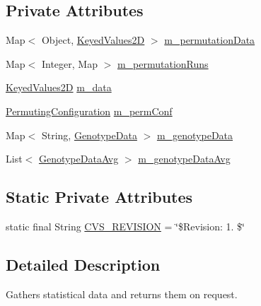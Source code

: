 \subsection*{Private Attributes}
\begin{DoxyCompactItemize}
\item 
Map$<$ Object, \hyperlink{classorg_1_1jgap_1_1audit_1_1_keyed_values2_d}{Keyed\-Values2\-D} $>$ \hyperlink{classorg_1_1jgap_1_1audit_1_1_evaluator_ab3402fedd8070cb0c0b8c693148b1c01}{m\-\_\-permutation\-Data}
\item 
Map$<$ Integer, Map $>$ \hyperlink{classorg_1_1jgap_1_1audit_1_1_evaluator_a841cc8c34e1870b35fe0e38715841e15}{m\-\_\-permutation\-Runs}
\item 
\hyperlink{classorg_1_1jgap_1_1audit_1_1_keyed_values2_d}{Keyed\-Values2\-D} \hyperlink{classorg_1_1jgap_1_1audit_1_1_evaluator_a7e7c140d026509d201e2054509293d88}{m\-\_\-data}
\item 
\hyperlink{classorg_1_1jgap_1_1audit_1_1_permuting_configuration}{Permuting\-Configuration} \hyperlink{classorg_1_1jgap_1_1audit_1_1_evaluator_aec14a492e20dcda8a92c18a8c76c10f3}{m\-\_\-perm\-Conf}
\item 
Map$<$ String, \hyperlink{classorg_1_1jgap_1_1audit_1_1_evaluator_1_1_genotype_data}{Genotype\-Data} $>$ \hyperlink{classorg_1_1jgap_1_1audit_1_1_evaluator_ae43c46df70ad2023f57b30b9cf039000}{m\-\_\-genotype\-Data}
\item 
List$<$ \hyperlink{classorg_1_1jgap_1_1audit_1_1_evaluator_1_1_genotype_data_avg}{Genotype\-Data\-Avg} $>$ \hyperlink{classorg_1_1jgap_1_1audit_1_1_evaluator_ac0acc7588da13daadeb981c1acc755ec}{m\-\_\-genotype\-Data\-Avg}
\end{DoxyCompactItemize}
\subsection*{Static Private Attributes}
\begin{DoxyCompactItemize}
\item 
static final String \hyperlink{classorg_1_1jgap_1_1audit_1_1_evaluator_a7a2bf7a73556818006b153c300212453}{C\-V\-S\-\_\-\-R\-E\-V\-I\-S\-I\-O\-N} = \char`\"{}\$Revision\-: 1. \$\char`\"{}
\end{DoxyCompactItemize}


\subsection{Detailed Description}
Gathers statistical data and returns them on request.

